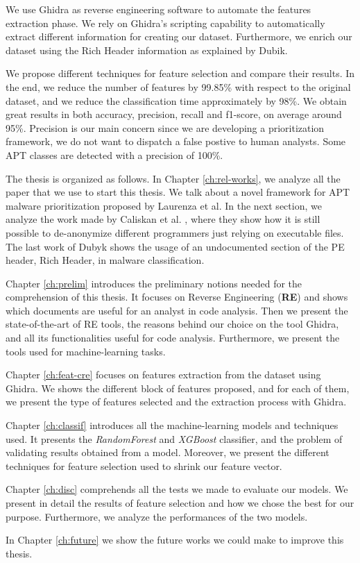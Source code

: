 We use Ghidra as reverse engineering software to automate the features extraction phase. We rely on Ghidra's scripting capability to automatically extract different information for creating our dataset. Furthermore, we enrich our dataset using the Rich Header information as explained by Dubik\cite{dubyk2019sans}.

We propose different techniques for feature selection and compare their results. In the end, we reduce the number of features by 99.85\% with respect to the original dataset, and we reduce the classification time approximately by 98\%. We obtain great results in both accuracy, precision, recall and f1-score, on average around 95\%. Precision is our main concern since we are developing a prioritization framework, we do not want to dispatch a false postive to human analysts. Some APT classes are detected with a precision of 100\%.


The thesis is organized as follows.
In Chapter \ref{ch:rel-works}, we analyze all the paper that we use to start this thesis. We talk about a novel framework for APT malware prioritization proposed by Laurenza et al. In the next section, we analyze the work made by Caliskan et al. \cite{caliskan2015anonymizing}, where they show how it is still possible to de-anonymize different programmers just relying on executable files. The last work of Dubyk \cite{dubyk2019sans} shows the usage of an undocumented section of the PE header, Rich Header, in malware classification.

Chapter \ref{ch:prelim} introduces the preliminary notions needed for the comprehension of this thesis. It focuses on Reverse Engineering (\textbf{RE}) and shows which documents are useful for an analyst in code analysis. Then we present the state-of-the-art of RE tools, the reasons behind our choice on the tool Ghidra, and all its functionalities useful for code analysis. Furthermore, we present the tools used for machine-learning tasks.

Chapter \ref{ch:feat-cre} focuses on features extraction from the dataset using Ghidra. We shows the different block of features proposed, and for each of them, we present the type of features selected and the extraction process with Ghidra.

Chapter \ref{ch:classif} introduces all the machine-learning models and techniques used. It presents the \textit{RandomForest} and \textit{XGBoost} classifier, and the problem of validating results obtained from a model. Moreover, we present the different techniques for feature selection used to shrink our feature vector.

Chapter \ref{ch:disc} comprehends all the tests we made to evaluate our models. We present in detail the results of feature selection and how we chose the best for our purpose.
Furthermore, we analyze the performances of the two models.

In Chapter \ref{ch:future} we show the future works we could make to improve this thesis. 